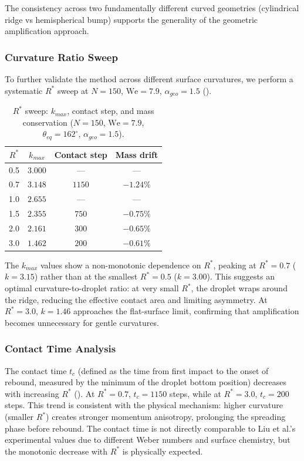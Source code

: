 The consistency across two fundamentally different curved geometries (cylindrical ridge vs hemispherical bump) supports the generality of the geometric amplification approach.

\subsubsection{Curvature Ratio Sweep}

To further validate the method across different surface curvatures, we perform a systematic $R^*$ sweep at $N=150$, $\mathrm{We}=7.9$, $\alpha_{geo}=1.5$ ().

\begin{table}[h]
\centering
\caption{$R^*$ sweep: $k_{max}$, contact step, and mass conservation ($N=150$, $\mathrm{We}=7.9$, $\theta_{eq}=162^\circ$, $\alpha_{geo}=1.5$).}
\label{tab:r_star_sweep}
\begin{tabular}{c|c|c|c}
\hline
$R^*$ & $k_{max}$ & Contact step & Mass drift \\
\hline
0.5  & $3.000$ & --- & --- \\
0.7  & $3.148$ & $1150$ & $-1.24\%$ \\
1.0  & $2.655$ & --- & --- \\
1.5  & $2.355$ & $750$ & $-0.75\%$ \\
2.0  & $2.161$ & $300$ & $-0.65\%$ \\
3.0  & $1.462$ & $200$ & $-0.61\%$ \\
\hline
\end{tabular}
\end{table}

The $k_{max}$ values show a non-monotonic dependence on $R^*$, peaking at $R^* = 0.7$ ($k = 3.15$) rather than at the smallest $R^* = 0.5$ ($k = 3.00$). This suggests an optimal curvature-to-droplet ratio: at very small $R^*$, the droplet wraps around the ridge, reducing the effective contact area and limiting asymmetry. At $R^* = 3.0$, $k = 1.46$ approaches the flat-surface limit, confirming that amplification becomes unnecessary for gentle curvatures.

\subsubsection{Contact Time Analysis}

The contact time $t_c$ (defined as the time from first impact to the onset of rebound, measured by the minimum of the droplet bottom position) decreases with increasing $R^*$ (). At $R^* = 0.7$, $t_c = 1150$ steps, while at $R^* = 3.0$, $t_c = 200$ steps. This trend is consistent with the physical mechanism: higher curvature (smaller $R^*$) creates stronger momentum anisotropy, prolonging the spreading phase before rebound. The contact time is not directly comparable to Liu et al.'s experimental values due to different Weber numbers and surface chemistry, but the monotonic decrease with $R^*$ is physically expected.


